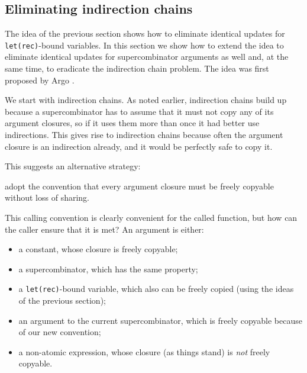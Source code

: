 \subsection{Eliminating indirection chains}
\label{sect:tim:sc-args}

The idea of the previous section shows how to eliminate identical
updates
for \mbox{\tt let(rec)}-bound variables.  In this section we show how
to extend the idea to eliminate identical updates for supercombinator
arguments as well and, at the same time, to eradicate the indirection chain
problem.
The idea was first proposed by Argo \cite{Argo89}.

We start with indirection chains.
As noted earlier, indirection chains build up because a supercombinator
has to assume that it must not copy any of its argument closures, so
if it uses them more than once it had better use indirections.
This gives rise to indirection chains because often the argument closure
is an indirection already, and it would be perfectly safe to copy it.

This suggests an alternative strategy:
\begin{important}
adopt the convention that
every argument closure must be freely copyable without loss of sharing.
\end{important}
This calling convention is clearly convenient for the called function,
but how can the caller ensure that it is met?
An argument is either:
\begin{itemize}
\item
a constant, whose closure is freely copyable;
\item
a supercombinator, which has the same property;
\item
a \mbox{\tt let(rec)}-bound variable, which also can be freely copied (using the ideas
of the previous section);
\item
an argument to the current supercombinator, which is freely copyable
because of our new convention;
\item
a non-atomic expression, whose closure (as things stand) is {\em not\/} freely
copyable.
\end{itemize}

